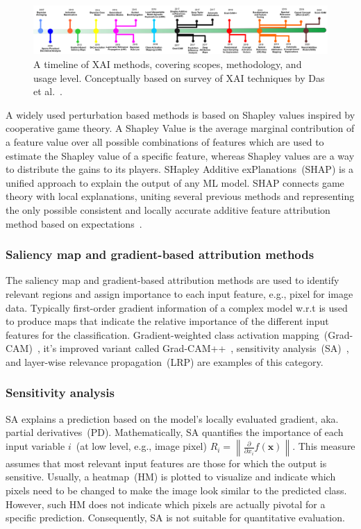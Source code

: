 \begin{figure}
	\centering
	\includegraphics[scale=0.8]{images/xai_timeline.png}	
    \caption[Timeline of XAI methods and algorithms]{A timeline of XAI methods, covering scopes, methodology, and usage level. Conceptually based on survey of XAI techniques by Das et al.~\cite{das2020opportunities}.}	
	\label{fig:xai_timeline}
\end{figure}

\hspace*{3.5mm} A widely used perturbation based methods is based on Shapley values inspired by cooperative game theory. A Shapley Value is the average marginal contribution of a feature value over all possible combinations of features which are used to estimate the Shapley value of a specific feature, whereas Shapley values are a way to distribute the gains to its players. SHapley Additive exPlanations~(SHAP) is a unified approach to explain the output of any ML model. SHAP connects game theory with local explanations, uniting several previous methods and representing the only possible consistent and locally accurate additive feature attribution method based on expectations~\cite{NIPS2017_7062}. 

\subsubsection{Saliency map and gradient-based attribution methods}
The saliency map and gradient-based attribution methods are used to identify relevant regions and assign importance to each input feature, e.g., pixel for image data. Typically first-order gradient information of a complex model w.r.t is used to produce maps that indicate the relative importance of the different input features for the classification. Gradient-weighted class activation mapping~(Grad-CAM)~\cite{selvaraju2017grad}, it's improved variant called Grad-CAM++~\cite{chattopadhay2018grad}, sensitivity analysis~(SA)~\cite{baehrens2010explain, simonyan2013deep}, and layer-wise relevance propagation~(LRP) are examples of this category. 

\subsubsection{Sensitivity analysis}
SA explains a prediction based on the model's locally evaluated gradient, aka. partial derivatives~(PD). Mathematically, SA quantifies the importance of each input variable $i$~(at low level, e.g., image pixel) $R_{i}=\left\|\frac{\partial}{\partial x_{i}} f(\mathbf{x})\right\|$. This measure assumes that most relevant input features are those for which the output is sensitive. Usually, a heatmap~(HM) is plotted to visualize and indicate which pixels need to be changed to make the image look similar to the predicted class. However, such HM does not indicate which pixels are actually pivotal for a specific prediction. Consequently, SA is not suitable for quantitative evaluation. 

